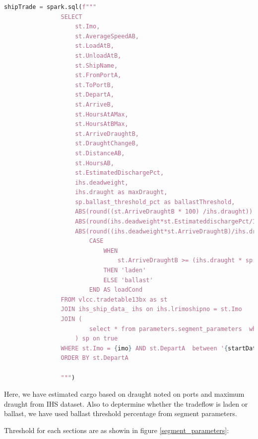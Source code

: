 \begin{lstlisting}[language=python, caption=SQL Query to get relevent data from \texttt{ihs} and \texttt{tradetable13bx}]
            shipTrade = spark.sql(f"""
                SELECT 
                    st.Imo,
                    st.AverageSpeedAB,
                    st.LoadAtB,
                    st.UnloadAtB,
                    st.ShipName,
                    st.FromPortA,
                    st.ToPortB,
                    st.DepartA,
                    st.ArriveB,
                    st.HoursAtAMax,
                    st.HoursAtBMax,
                    st.ArriveDraughtB,
                    st.DraughtChangeB,
                    st.DistanceAB,
                    st.HoursAB,
                    st.EstimatedDischargePct,
                    ihs.deadweight,
                    ihs.draught as maxDraught,
                    sp.ballast_threshold_pct as ballastThreshold,
                    ABS(round((st.ArriveDraughtB * 100) /ihs.draught)) as draughtPercentage,
                    ABS(round(ihs.deadweight*st.EstimateddischargePct/100,0)) as cargoEst,
                    ABS(round((ihs.deadweight*st.ArriveDraughtB)/ihs.draught)) as cargoEst2,
                        CASE 
                            WHEN 
                                st.ArriveDraughtB >= (ihs.draught * sp.ballast_threshold_pct / 100.0) 
                            THEN 'laden'
                            ELSE 'ballast'
                        END AS loadCond
                FROM vlcc.tradetable13bx as st
                JOIN ihs_ship_data_ ihs on ihs.lrimoshipno = st.Imo
                JOIN ( 
                        select * from parameters.segment_parameters  where segment = '{segment}'
                    ) sp on true
                WHERE st.Imo = {imo} AND st.DepartA  between '{startDate}' AND '{endDate}' AND st.ArriveDraughtB IS NOT null
                ORDER BY st.DepartA
                      
                """)
          \end{lstlisting}

Here, we have estimated cargo based on draught noted on ports and maximum draught from IHS dataset.
Also to deptermine whether the tradeflow is laden or ballast, we have used ballast threshold percentage from segment parameters.

Threshold for each sections are as showin in figure \ref{segment_parameters}:

